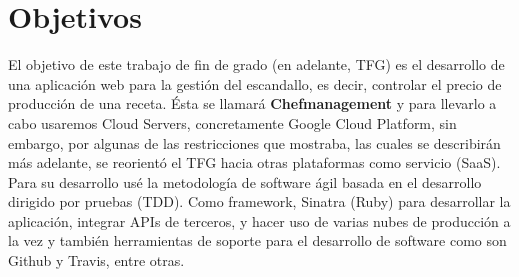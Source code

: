 

%

\section{Objetivos}
\label{cap.1.1}
El objetivo de este trabajo de fin de grado (en adelante, TFG) es el desarrollo de una aplicación web para la gestión del escandallo, es decir, controlar el precio de producción de una receta. Ésta se llamará \textbf{Chefmanagement} y para llevarlo a cabo usaremos Cloud Servers, concretamente Google Cloud Platform, sin embargo, por algunas de las restricciones que mostraba, las cuales se describirán más adelante, se reorientó el TFG hacia otras plataformas como servicio (SaaS). Para su desarrollo usé la metodología de software ágil basada en el desarrollo dirigido por pruebas (TDD). Como framework, Sinatra (Ruby) para desarrollar la aplicación, integrar APIs de terceros, y hacer uso de varias nubes de producción a la vez y también herramientas de soporte para el desarrollo de software como son Github y Travis, entre otras.

\vspace*{0.2in}
